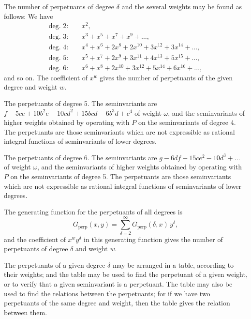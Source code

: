 \documentclass[11pt,a4paper]{book}
\begin{document}
\setcounter{art}{59}
\begin{art}
The number of perpetuants of degree $\delta$ and the several weights may be found as follows: We have
\begin{align*}
\text{deg. } 2:\quad & x^{2},\\
\text{deg. } 3:\quad & x^{3} + x^{5} + x^{7} + x^{9} + \ldots,\\
\text{deg. } 4:\quad & x^{4} + x^{6} + 2x^{8} + 2x^{10} + 3x^{12} + 3x^{14} + \ldots,\\
\text{deg. } 5:\quad & x^{5} + x^{7} + 2x^{9} + 3x^{11} + 4x^{13} + 5x^{15} + \ldots,\\
\text{deg. } 6:\quad & x^{6} + x^{8} + 2x^{10} + 3x^{12} + 5x^{14} + 6x^{16} + \ldots,
\end{align*}
and so on. The coefficient of $x^{w}$ gives the number of perpetuants of the given degree and weight $w$.
\end{art}

\setcounter{art}{60}
\begin{art}
The perpetuants of degree 5. The seminvariants are $f - 5ce + 10b^{2}e - 10cd^{2} + 15bcd - 6b^{3}d + c^{4}$ of weight $\omega$, and the seminvariants of higher weights obtained by operating with $P$ on the seminvariants of degree 4. The perpetuants are those seminvariants which are not expressible as rational integral functions of seminvariants of lower degrees.
\end{art}

\setcounter{art}{61}
\begin{art}
The perpetuants of degree 6. The seminvariants are $g - 6df + 15ce^{2} - 10d^{3} + \ldots$ of weight $\omega$, and the seminvariants of higher weights obtained by operating with $P$ on the seminvariants of degree 5. The perpetuants are those seminvariants which are not expressible as rational integral functions of seminvariants of lower degrees.
\end{art}

\setcounter{art}{62}
\begin{art}
The generating function for the perpetuants of all degrees is
\[
G_{\text{perp}}(x, y) = \sum_{\delta=2}^{\infty} G_{\text{perp}}(\delta, x)\,y^{\delta},
\]
and the coefficient of $x^{w}y^{\delta}$ in this generating function gives the number of perpetuants of degree $\delta$ and weight $w$.
\end{art}

\setcounter{art}{63}
\begin{art}
The perpetuants of a given degree $\delta$ may be arranged in a table, according to their weights; and the table may be used to find the perpetuant of a given weight, or to verify that a given seminvariant is a perpetuant. The table may also be used to find the relations between the perpetuants; for if we have two perpetuants of the same degree and weight, then the table gives the relation between them.
\end{art}
\end{document}
